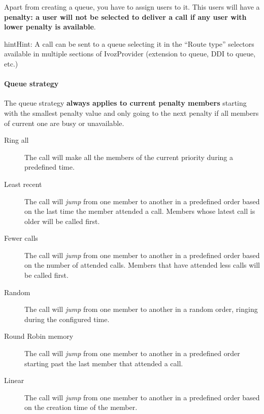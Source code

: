 \documentclass[letterpaper,10pt,english]{sphinxmanual}
\begin{document}
Apart from creating a queue, you have to assign users to it. This users will have
a \textbf{penalty: a user will not be selected to deliver a call if any user with lower
penalty is available}.

\begin{notice}{hint}{Hint:}
A call can be sent to a queue selecting it in the ``Route type'' selectors
available in multiple sections of IvozProvider (extension to queue, DDI
to queue, etc.)
\end{notice}


\paragraph{Queue strategy}
\label{administration_portal/client/vpbx/routing_endpoints/queues:queue-strategy}
The queue strategy \textbf{always applies to current penalty members} starting with
the smallest penalty value and only going to the next penalty if all members of
current one are busy or unavailable.
\begin{description}
\item[{Ring all}] \leavevmode{}\label{administration_portal/client/vpbx/routing_endpoints/queues:term-ring-all}
The call will make all the members of the current priority during a
predefined time.

\item[{Least recent}] \leavevmode{}\label{administration_portal/client/vpbx/routing_endpoints/queues:term-least-recent}
The call will \emph{jump} from one member to another in a predefined order
based on the last time the member attended a call. Members whose latest
call is older will be called first.

\item[{Fewer calls}] \leavevmode{}\label{administration_portal/client/vpbx/routing_endpoints/queues:term-fewer-calls}
The call will \emph{jump} from one member to another in a predefined order
based on the number of attended calls. Members that have attended less
calls will be called first.

\item[{Random}] \leavevmode{}\label{administration_portal/client/vpbx/routing_endpoints/queues:term-random}
The call will \emph{jump} from one member to another in a random order,
ringing during the configured time.

\item[{Round Robin memory}] \leavevmode{}\label{administration_portal/client/vpbx/routing_endpoints/queues:term-round-robin-memory}
The call will \emph{jump} from one member to another in a predefined order
starting past the last member that attended a call.

\item[{Linear}] \leavevmode{}\label{administration_portal/client/vpbx/routing_endpoints/queues:term-linear}
The call will \emph{jump} from one member to another in a predefined order
based on the creation time of the member.

\end{description}
\end{document}
